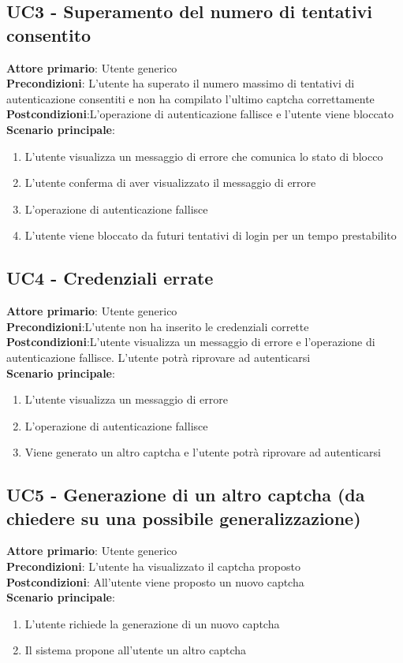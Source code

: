 \subsection{UC3 - Superamento del numero di tentativi consentito}
\textbf{Attore primario}: Utente generico\\
\textbf{Precondizioni}: L'utente ha superato il numero massimo di tentativi di autenticazione consentiti e non ha compilato l'ultimo captcha correttamente\\
\textbf{Postcondizioni}:L'operazione di autenticazione fallisce e l'utente viene bloccato\\
\textbf{Scenario principale}:
\begin{enumerate}
   \item L'utente visualizza un messaggio di errore che comunica lo stato di blocco
   \item L'utente conferma di aver visualizzato il messaggio di errore
   \item L'operazione di autenticazione fallisce
   \item L'utente viene bloccato da futuri tentativi di login per un tempo prestabilito
\end{enumerate}

\subsection{UC4 - Credenziali errate}
\textbf{Attore primario}: Utente generico\\
\textbf{Precondizioni}:L'utente non ha inserito le credenziali corrette\\
\textbf{Postcondizioni}:L'utente visualizza un messaggio di errore e l'operazione di autenticazione fallisce. L'utente potrà riprovare  ad autenticarsi\\
\textbf{Scenario principale}:
\begin{enumerate}
   \item L'utente visualizza un messaggio di errore
   \item L'operazione di autenticazione fallisce
   \item Viene generato un altro captcha e l'utente potrà riprovare ad autenticarsi
\end{enumerate}

\subsection{UC5 - Generazione di un altro captcha (da chiedere su una possibile generalizzazione)}
\textbf{Attore primario}: Utente generico\\
\textbf{Precondizioni}: L'utente ha visualizzato il captcha proposto\\
\textbf{Postcondizioni}: All'utente viene proposto un nuovo captcha\\
\textbf{Scenario principale}:
\begin{enumerate}
   \item L'utente richiede la generazione di un nuovo captcha
   \item Il sistema propone all'utente un altro captcha
\end{enumerate}
